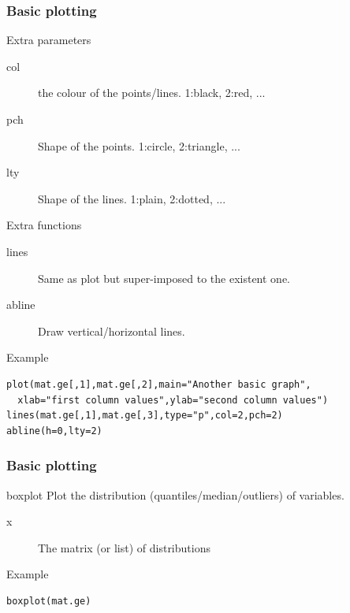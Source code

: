 \documentclass[10pt]{beamer}
\newenvironment{xframe}[2][]
  {\begin{frame}[fragile,environment=xframe,#1]
  \frametitle{#2}}
  {\end{frame}}
\begin{document}

\begin{xframe}{Basic plotting}
  \begin{block}{Extra parameters}
    \begin{description}
      \item[col] the colour of the points/lines. 1:black, 2:red, ...
      \item[pch] Shape of the points. 1:circle, 2:triangle, ...
      \item[lty] Shape of the lines. 1:plain, 2:dotted, ...
    \end{description}
  \end{block}
  \begin{block}{Extra functions}
    \begin{description}
      \item[lines] Same as plot but super-imposed to the existent one.
      \item[abline] Draw vertical/horizontal lines.  
    \end{description}
  \end{block}
  \begin{exampleblock}{Example}
\begin{verbatim}
plot(mat.ge[,1],mat.ge[,2],main="Another basic graph",
  xlab="first column values",ylab="second column values")
lines(mat.ge[,1],mat.ge[,3],type="p",col=2,pch=2)
abline(h=0,lty=2)
\end{verbatim}  
  \end{exampleblock}
\end{xframe}



\begin{xframe}{Basic plotting}
  \begin{block}{{\sf boxplot}}
    Plot the distribution (quantiles/median/outliers) of variables.
    \begin{description}
    \item[x] The {\sf matrix} (or {\sf list}) of distributions
    \end{description}
  \end{block}
  \begin{exampleblock}{Example}
\begin{verbatim}
boxplot(mat.ge)
\end{verbatim}  
  \end{exampleblock}
\end{xframe}
\end{document}
